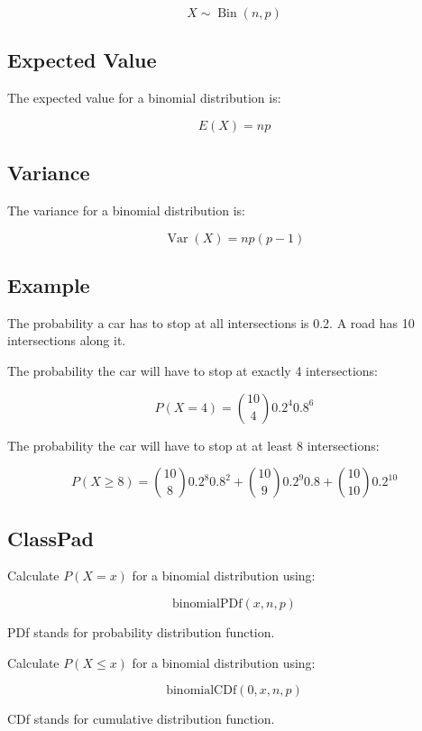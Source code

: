 \documentclass[a4paper,11pt]{article}
\DeclareMathOperator\Bin{Bin}
\DeclareMathOperator\Var{Var}
\begin{document}
$$
X \sim \Bin(n, p)
$$


\subsection{Expected Value}

The expected value for a binomial distribution is:

$$
E(X) = np
$$


\subsection{Variance}

The variance for a binomial distribution is:

$$
\Var(X) = np(p - 1)
$$


\subsection{Example}

The probability a car has to stop at all intersections is 0.2. A road has
10 intersections along it.

The probability the car will have to stop at exactly 4 intersections:

$$
P(X = 4) = \binom{10}{4} 0.2^4 0.8^6
$$

The probability the car will have to stop at at least 8 intersections:

$$
P(X \geq 8) = \binom{10}{8} 0.2^8 0.8^2 + \binom{10}{9} 0.2^9 0.8 + \binom{10}{10} 0.2^{10}
$$


\subsection{ClassPad}

Calculate $P(X = x)$ for a binomial distribution using:

$$
\text{binomialPDf}(x, n, p)
$$

PDf stands for probability distribution function.

Calculate $P(X \leq x)$ for a binomial distribution using:

$$
\text{binomialCDf}(0, x, n, p)
$$

CDf stands for cumulative distribution function.
\end{document}
